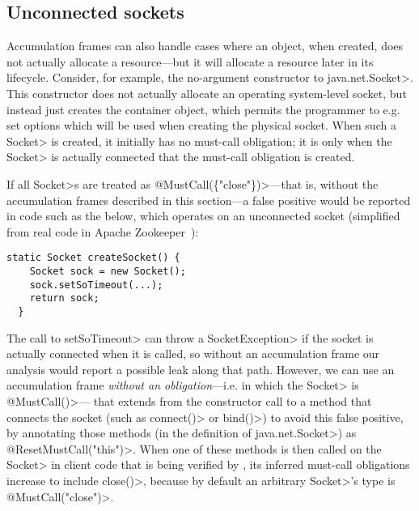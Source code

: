 \subsection{Unconnected sockets}
\label{sec:unconnected-sockets}
Accumulation frames can also handle cases where an object, when created,
does not actually allocate a resource---but it will allocate a resource
later in its lifecycle. Consider, for example, the no-argument constructor
to \<java.net.Socket>. This constructor does not actually allocate an
operating system-level socket, but instead just creates the container
object, which permits the programmer to e.g. set options which will be used
when creating the physical socket. When such a \<Socket> is created, it
initially has no must-call obligation; it is only when the \<Socket> is
actually connected that the must-call obligation is created.

If all \<Socket>s are treated as \<@MustCall(\{"close"\})>---that is,
without the accumulation frames described in this section---a false positive
would be reported
in code such as the below, which operates on an unconnected socket
(simplified from real code in Apache Zookeeper~):

\begin{lstlisting}[frame=tb,belowskip=3mm]
  static Socket createSocket() {
    Socket sock = new Socket();
    sock.setSoTimeout(...);
    return sock;
  }
\end{lstlisting}

The call to \<setSoTimeout> can throw a \<SocketException> if the
socket is actually connected when it is called, so without an
accumulation frame our analysis would report a possible leak along
that path.  However, we can use an accumulation frame \emph{without an
  obligation}---i.e. in which the \<Socket> is \<@MustCall({})>---
that extends from the constructor call to a method that connects the
socket (such as \<connect()> or \<bind()>) to avoid this false
positive, by annotating those methods (in the definition of
\<java.net.Socket>) as \<@ResetMustCall("this")>.  When one of these
methods is then called on the \<Socket> in client code that is being
verified by \Tool, its inferred must-call obligations increase to include
\<close()>, because by default an arbitrary \<Socket>'s type is
\<@MustCall("close")>.

